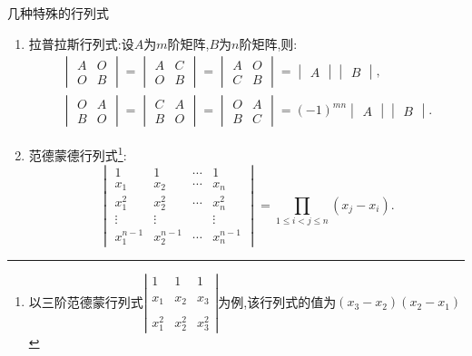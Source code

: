 \documentclass[8pt a4paper, oneside, UTF8]{ctexbook}
\begin{document}
\begin{sloppypar}
\begin{criterion}{几种特殊的行列式}{}
\begin{enumerate}
            \item 拉普拉斯行列式:设$A$为$m$阶矩阵,$B$为$n$阶矩阵,则:$$\begin{gathered}\begin{vmatrix}A&O\\O&B\end{vmatrix}=\begin{vmatrix}A&C\\O&B\end{vmatrix}=\begin{vmatrix}A&O\\C&B\end{vmatrix}=\begin{vmatrix}A\end{vmatrix}\begin{vmatrix}B\end{vmatrix},\\\begin{vmatrix}O&A\\B&O\end{vmatrix}=\begin{vmatrix}C&A\\B&O\end{vmatrix}=\begin{vmatrix}O&A\\B&C\end{vmatrix}=(-1)^{mn}\begin{vmatrix}A\end{vmatrix}\begin{vmatrix}B\end{vmatrix} .\end{gathered}$$
            \item 范德蒙德行列式\footnote{以三阶范德蒙行列式$\left.\left|\begin{array}{cccc}1&1&1\\\\x_1&x_2&x_3\\\\x_1^2&x_2^2&x_3^2\end{array}\right.\right|$为例,该行列式的值为$(x_3-x_2)(x_2-x_1)$}:$$\begin{vmatrix}1&1&\cdots&1\\x_1&x_2&\cdots&x_n\\x_1^2&x_2^2&\cdots&x_n^2\\\vdots&\vdots&&\vdots\\x_1^{n-1}&x_2^{n-1}&\cdots&x_n^{n-1}\end{vmatrix}=\prod_{1\leqslant i<j\leqslant n}(x_j-x_i).$$
        \end{enumerate}
    \end{criterion}

\end{sloppypar}
\end{document}
